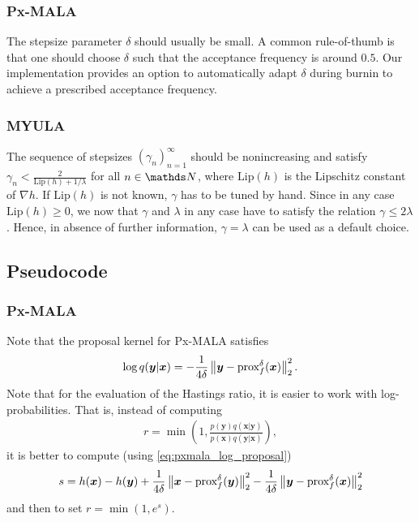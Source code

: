 \documentclass[10pt]{article}
\numberwithin{equation}{section}
\begin{document}
\subsubsection*{Px-MALA}

The stepsize parameter $\delta$ should usually be small. A common rule-of-thumb is that one should choose $\delta$ such that the acceptance frequency is around $0.5$. Our implementation provides an option to automatically adapt $\delta$ during burnin to achieve a prescribed acceptance frequency.

\subsubsection*{MYULA}

The sequence of stepsizes $(\gamma_n)_{n=1}^\infty$ should be nonincreasing and satisfy $\gamma_n < \frac{2}{\mathrm{Lip}(h) + 1/\lambda}$ for all $n \in \N$, where $\mathrm{Lip}(h)$ is the Lipschitz constant of $\nabla h$. If $\mathrm{Lip}(h)$ is not known, $\gamma$ has to be tuned by hand. Since in any case $\mathrm{Lip}(h) \geq 0$, we now that $\gamma$ and $\lambda$ in any case have to satisfy the relation $\gamma \leq 2 \lambda$. Hence, in absence of further information, $\gamma = \lambda$ can be used as a default choice.

\subsection{Pseudocode}

\subsubsection*{Px-MALA}

Note that the proposal kernel for Px-MALA satisfies
\begin{align}
\log q(\bm y | \bm x) = - \frac{1}{4\delta}\left\|\bm y - \text{prox}_{f}^{\delta}(\bm x)\right\|_2^2. \label{eq:pxmala_log_proposal}
\end{align}
Note that for the evaluation of the Hastings ratio, it is easier to work with log-probabilities. That is, instead of computing
\begin{align*}
r = \min \left( 1, \frac{p(\bm y) q(\bm x | \bm y)}{p(\bm x) q(\bm y | \bm x)} \right),
\end{align*}
it is better to compute (using \eqref{eq:pxmala_log_proposal})
\begin{align*}
s = h(\bm x) - h(\bm y) + \frac{1}{4 \delta}\left\|\bm x - \text{prox}_{f}^{\delta}(\bm y)\right\|_2^2 - \frac{1}{4 \delta}\left\|\bm y - \text{prox}_{f}^{\delta}(\bm x)\right\|_2^2
\end{align*}
and then to set $r = \min(1, e^s)$.
\end{document}
